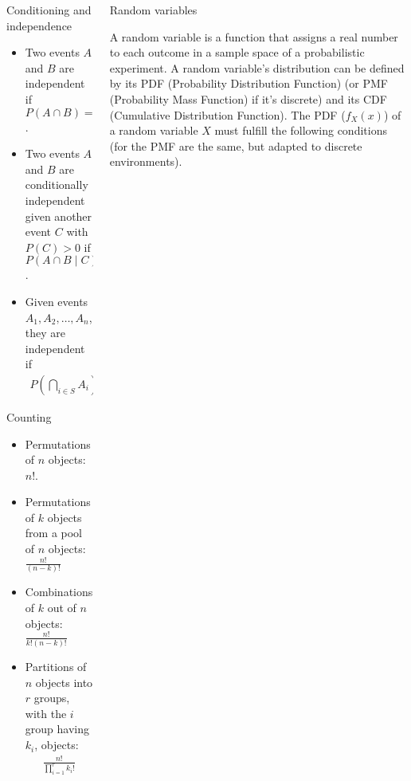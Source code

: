 \documentclass{beamer}
\begin{document}
\begin{frame}
\begin{columns}
\begin{column}{0.3\textwidth}
\begin{block}{Conditioning and independence}
\begin{itemize}
    \item Two events $A$ and $B$ are independent if $P(A \cap B) = P(A)P(B)$.
    \item Two events $A$ and $B$ are conditionally independent given another event $C$ with $P(C) > 0$ if $P(A \cap B \mid C) = P(A \mid C)P(B \mid C)$.
    \item Given events $A_1, A_2, \ldots, A_n$, they are independent if
    \begin{align*}
        P(\bigcap_{i \in S} A_i) = \prod_{i \in S} P(A_i), \text{for every subset } S \text{ of } \{1, 2, \ldots, n\}.
    \end{align*}
\end{itemize}

\end{block}

\begin{block}{Counting}

\begin{itemize}
    \item Permutations of $n$ objects: $n!$.
    \item Permutations of $k$ objects from a pool of $n$ objects: $\frac{n!}{(n - k)!}$
    \item Combinations of $k$ out of $n$ objects: $\frac{n!}{k!(n-k)!}$
    \item Partitions of $n$ objects into $r$ groups, with the $i$ group having $k_i$, objects:
        \begin{align*}
            \frac{n!}{\prod_{i=1}^r k_i!}
        \end{align*}
\end{itemize}

\end{block}

\end{column}

\begin{column}{0.3\textwidth}
\begin{block}{Random variables}

A random variable is a function that assigns a real number to each outcome in a sample space of a probabilistic experiment. A random variable's distribution can be defined by its PDF (Probability Distribution Function) (or PMF (Probability Mass Function) if it's discrete) and its CDF (Cumulative Distribution Function). The PDF ($f_X(x)$) of a random variable $X$ must fulfill the following conditions (for the PMF are the same, but adapted to discrete environments).


\end{block}
\end{column}
\end{columns}
\end{frame}
\end{document}

